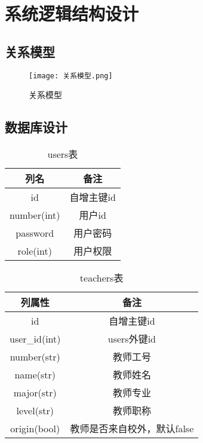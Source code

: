 \section{系统逻辑结构设计}

\subsection{关系模型}
\begin{figure}[h]
    \centering
    \texttt{[image: 关系模型.png]}
    \caption{关系模型}
    \label{fig:ER}
\end{figure}

\clearpage

\subsection{数据库设计}



\begin{table}[ht]
    \centering
    \caption{users表}
    \begin{tabular}{|c|c|}
        \hline
        列名          & 备注     \\
        \hline
        id          & 自增主键id \\
        \hline
        number(int) & 用户id   \\
        \hline
        password    & 用户密码   \\
        \hline
        role(int)   & 用户权限   \\
        \hline
    \end{tabular}
    
    \label{tab:users}
\end{table}


\begin{table}[ht]
    \centering
    \caption{teachers表}
    \begin{tabular}{|c|c|}
        \hline
        列属性           & 备注               \\
        \hline
        id            & 自增主键id           \\
        \hline
        user\_id(int) & users外键id        \\
        \hline
        number(str)   & 教师工号             \\
        \hline
        name(str)     & 教师姓名             \\
        \hline
        major(str)    & 教师专业             \\
        \hline
        level(str)    & 教师职称             \\
        \hline
        origin(bool)  & 教师是否来自校外，默认false \\
        \hline
    \end{tabular}
    
    \label{tab:teachers}
\end{table}


